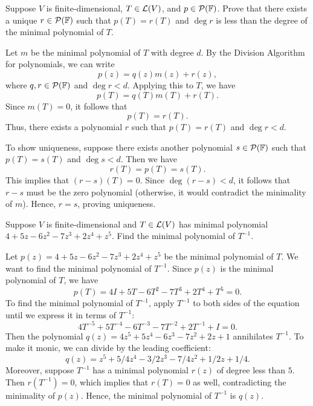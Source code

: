 \begin{exc}
\begin{exercise}
Suppose $V$ is finite-dimensional, $T\in\mathcal{L}(V)$, and $p\in\mathcal{P}(\mathbb{F})$. Prove
that there exists a unique $r\in\mathcal{P}(\mathbb{F})$ such that $p(T)=r(T)$ and $\deg r$
is less than the degree of the minimal polynomial of $T$.
\end{exercise}
\begin{solution}
Let $m$ be the minimal polynomial of $T$ with degree $d$. By the Division
Algorithm for polynomials, we can write
\[ p(z)=q(z)m(z)+r(z), \]
where $q,r\in\mathcal{P}(\mathbb{F})$ and $\deg r<d$. Applying this to $T$, we have
\[ p(T)=q(T)m(T)+r(T). \]
Since $m(T)=0$, it follows that
\[ p(T)=r(T). \]
Thus, there exists a polynomial $r$ such that $p(T)=r(T)$ and $\deg r<d$.

To show uniqueness, suppose there exists another polynomial $s\in\mathcal{P}(\mathbb{F})$
such that $p(T)=s(T)$ and $\deg s<d$. Then we have
\[ r(T)=p(T)=s(T). \]
This implies that $(r-s)(T)=0$. Since $\deg(r-s)<d$, it follows that $r-s$
must be the zero polynomial (otherwise, it would contradict the minimality of
$m$). Hence, $r=s$, proving uniqueness.
\end{solution}

\begin{exercise}
Suppose $V$ is finite-dimensional and $T\in\mathcal{L}(V)$ has minimal polynomial
$4+5z-6z^2-7z^3+2z^4+z^5$. Find the minimal polynomial of $T^{-1}$.
\end{exercise}
\begin{solution}
Let $p(z)=4+5z-6z^2-7z^3+2z^4+z^5$ be the minimal polynomial of $T$. We want
to find the minimal polynomial of $T^{-1}$. Since $p(z)$ is the minimal
polynomial of $T$, we have
\[ p(T)=4I+5T-6T^2-7T^3+2T^4+T^5=0. \]
To find the minimal polynomial of $T^{-1}$, apply $T^{-1}$ to both sides of
the equation until we express it in terms of $T^{-1}$:
\[ 4T^{-5}+5T^{-4}-6T^{-3}-7T^{-2}+2T^{-1}+I=0. \]
Then the polynomial $q(z)=4z^5+5z^4-6z^3-7z^2+2z+1$ annihilates $T^{-1}$. To
make it monic, we can divide by the leading coefficient:
\[ q(z)=z^5+5/4z^4-3/2z^3-7/4z^2+1/2z+1/4. \]
Moreover, suppose $T^{-1}$ has a minimal polynomial $r(z)$ of degree less than
$5$. Then $r(T^{-1})=0$, which implies that $r(T)=0$ as well, contradicting
the minimality of $p(z)$. Hence, the minimal polynomial of $T^{-1}$ is $q(z)$.
\end{solution}


\end{exc}
